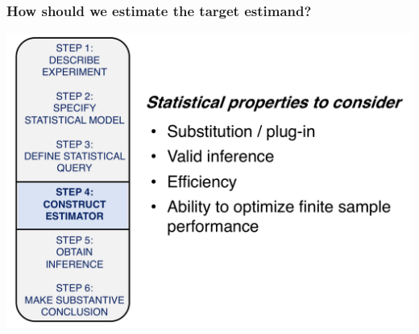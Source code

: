 \documentclass[t]{beamer}
\begin{document}
\begin{frame}
  \frametitle{How should we estimate the target estimand?}
  \vspace{-20pt}
  \begin{center}
  \includegraphics[width = 1.05\textwidth]{figures/roadmap4.pdf}
  \end{center}
\end{frame}
\end{document}
